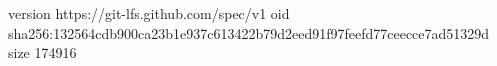 version https://git-lfs.github.com/spec/v1
oid sha256:132564cdb900ca23b1e937c613422b79d2eed91f97feefd77ceecce7ad51329d
size 174916
